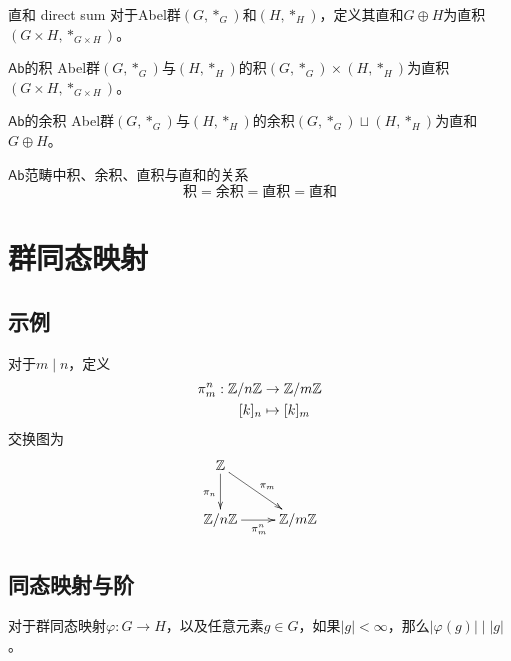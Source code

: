 \begin{definition}{直和 direct sum}
	对于Abel群$(G,*_G)$和$(H,*_H)$，定义其直和$G\oplus H$为直积$(G\times H,*_{G\times H})$。
\end{definition}

\begin{definition}{$\mathsf{Ab}$的积}
	Abel群$(G,*_G)$与$(H,*_H)$的积$(G,*_G)\times (H,*_H)$为直积$(G\times H,*_{G\times H})$。
\end{definition}

\begin{definition}{$\mathsf{Ab}$的余积}
	Abel群$(G,*_G)$与$(H,*_H)$的余积$(G,*_G)\sqcup (H,*_H)$为直和$G\oplus H$。
\end{definition}

\begin{proposition}{$\mathsf{Ab}$范畴中积、余积、直积与直和的关系}
	$$
	\text{积}=\text{余积}=\text{直积}=\text{直和}
	$$
\end{proposition}

\section{群同态映射}

\subsection{示例}

\begin{example}
	对于$m\mid n$，定义
	\begin{align*}
		\pi_m^n:\begin{aligned}[t]
			\mathbb{Z}/n\mathbb{Z}&\to \mathbb{Z}/m\mathbb{Z}\\
			[k]_n&\mapsto [k]_m
		\end{aligned}
	\end{align*}
	交换图为
	$$
	\xymatrix{
		\Z \ar[d]_{\pi_n} \ar[rd]^{\pi_m}\\
		\Z/n\Z \ar[r]_{\pi_m^n} & \Z/m\Z
	}
	$$
\end{example}

\subsection{同态映射与阶}

\begin{proposition}
	对于群同态映射$\varphi:G\to H$，以及任意元素$g\in G$，如果$|g|<\infty$，那么$|\varphi(g)|\mid |g|$。
\end{proposition}

